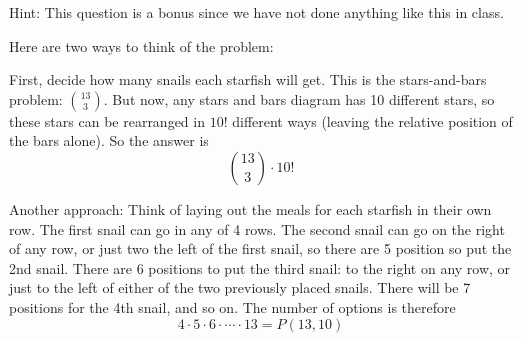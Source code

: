 \documentclass[11pt]{exam}
\begin{document}
\begin{questions}
Hint: This question is a bonus since we have not done anything like this in class.

\begin{solution}
  Here are two ways to think of the problem:

  First, decide how many snails each starfish will get.  This is the stars-and-bars problem: ${13 \choose 3}$.  But now, any stars and bars diagram has 10 different stars, so these stars can be rearranged in $10!$ different ways (leaving the relative position of the bars alone).  So the answer is
  \[{13 \choose 3}\cdot 10!\]

  Another approach:  Think of laying out the meals for each starfish in their own row.  The first snail can go in any of 4 rows.  The second snail can go on the right of any row, or just two the left of the first snail, so there are 5 position so put the 2nd snail.  There are 6 positions to put the third snail: to the right on any row, or just to the left of either of the two previously placed snails.  There will be 7 positions for the 4th snail, and so on.  The number of options is therefore
  \[4 \cdot 5 \cdot 6 \cdot \cdots \cdot 13 = P(13,10)\]
\end{solution}

%
%
%
%
%
%



\end{questions}
\end{document}
